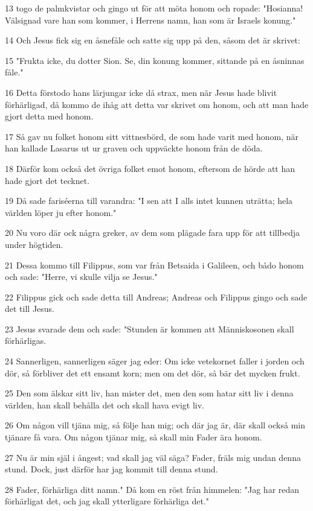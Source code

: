 \par 13 togo de palmkvistar och gingo ut för att möta honom och ropade: "Hosianna! Välsignad vare han som kommer, i Herrens namn, han som är Israels konung."
\par 14 Och Jesus fick sig en åsnefåle och satte sig upp på den, såsom det är skrivet:
\par 15 "Frukta icke, du dotter Sion. Se, din konung kommer, sittande på en åsninnas fåle."
\par 16 Detta förstodo hans lärjungar icke då strax, men när Jesus hade blivit förhärligad, då kommo de ihåg att detta var skrivet om honom, och att man hade gjort detta med honom.
\par 17 Så gav nu folket honom sitt vittnesbörd, de som hade varit med honom, när han kallade Lasarus ut ur graven och uppväckte honom från de döda.
\par 18 Därför kom också det övriga folket emot honom, eftersom de hörde att han hade gjort det tecknet.
\par 19 Då sade fariséerna till varandra: "I sen att I alls intet kunnen uträtta; hela världen löper ju efter honom."
\par 20 Nu voro där ock några greker, av dem som plägade fara upp för att tillbedja under högtiden.
\par 21 Dessa kommo till Filippus, som var från Betsaida i Galileen, och bådo honom och sade: "Herre, vi skulle vilja se Jesus."
\par 22 Filippus gick och sade detta till Andreas; Andreas och Filippus gingo och sade det till Jesus.
\par 23 Jesus svarade dem och sade: "Stunden är kommen att Människosonen skall förhärligas.
\par 24 Sannerligen, sannerligen säger jag eder: Om icke vetekornet faller i jorden och dör, så förbliver det ett ensamt korn; men om det dör, så bär det mycken frukt.
\par 25 Den som älskar sitt liv, han mister det, men den som hatar sitt liv i denna världen, han skall behålla det och skall hava evigt liv.
\par 26 Om någon vill tjäna mig, så följe han mig; och där jag är, där skall också min tjänare få vara. Om någon tjänar mig, så skall min Fader ära honom.
\par 27 Nu är min själ i ångest; vad skall jag väl säga? Fader, fräls mig undan denna stund. Dock, just därför har jag kommit till denna stund.
\par 28 Fader, förhärliga ditt namn." Då kom en röst från himmelen: "Jag har redan förhärligat det, och jag skall ytterligare förhärliga det."
